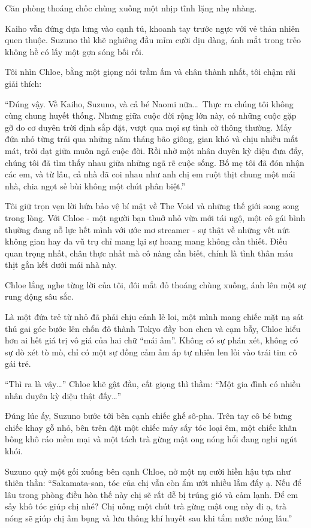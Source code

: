 \documentclass[../main.tex]{subfiles}
\begin{document}
Căn phòng thoáng chốc chùng xuống một nhịp tĩnh lặng nhẹ nhàng.

Kaiho vẫn đứng dựa lưng vào cạnh tủ, khoanh tay trước ngực với vẻ thản nhiên quen thuộc. Suzuno thì khẽ nghiêng đầu mỉm cười dịu dàng, ánh mắt trong trẻo không hề có lấy một gợn sóng bối rối.

Tôi nhìn Chloe, bằng một giọng nói trầm ấm và chân thành nhất, tôi chậm rãi giải thích:

``Đúng vậy. Về Kaiho, Suzuno, và cả bé Naomi nữa\dots\ Thực ra chúng tôi không cùng chung huyết thống. Nhưng giữa cuộc đời rộng lớn này, có những cuộc gặp gỡ do cơ duyên trời định sắp đặt, vượt qua mọi sự tình cờ thông thường. Mấy đứa nhỏ từng trải qua những năm tháng bão giông, gian khó và chịu nhiều mất mát, trôi dạt giữa muôn ngả cuộc đời. Rồi nhờ một nhân duyên kỳ diệu đưa đẩy, chúng tôi đã tìm thấy nhau giữa những ngã rẽ cuộc sống. Bố mẹ tôi đã đón nhận các em, và từ lâu, cả nhà đã coi nhau như anh chị em ruột thịt chung một mái nhà, chia ngọt sẻ bùi không một chút phân biệt.''

Tôi giữ trọn vẹn lời hứa bảo vệ bí mật về The Void và những thế giới song song trong lòng. Với Chloe - một người bạn thuở nhỏ vừa mới tái ngộ, một cô gái bình thường đang nỗ lực hết mình với ước mơ streamer - sự thật về những vết nứt không gian hay đa vũ trụ chỉ mang lại sự hoang mang không cần thiết. Điều quan trọng nhất, chân thực nhất mà cô nàng cần biết, chính là tình thân máu thịt gắn kết dưới mái nhà này.

Chloe lắng nghe từng lời của tôi, đôi mắt đỏ thoáng chùng xuống, ánh lên một sự rung động sâu sắc.

Là một đứa trẻ từ nhỏ đã phải chịu cảnh lẻ loi, một mình mang chiếc mặt nạ sát thủ gai góc bước lên chốn đô thành Tokyo đầy bon chen và cạm bẫy, Chloe hiểu hơn ai hết giá trị vô giá của hai chữ ``mái ấm''. Không có sự phán xét, không có sự dò xét tò mò, chỉ có một sự đồng cảm ấm áp tự nhiên len lỏi vào trái tim cô gái trẻ.

``Thì ra là vậy\dots'' Chloe khẽ gật đầu, cất giọng thì thầm: ``Một gia đình có nhiều nhân duyên kỳ diệu thật đấy\dots''

Đúng lúc ấy, Suzuno bước tới bên cạnh chiếc ghế sô-pha. Trên tay cô bé bưng chiếc khay gỗ nhỏ, bên trên đặt một chiếc máy sấy tóc loại êm, một chiếc khăn bông khô ráo mềm mại và một tách trà gừng mật ong nóng hổi đang nghi ngút khói.

Suzuno quỳ một gối xuống bên cạnh Chloe, nở một nụ cười hiền hậu tựa như thiên thần: ``Sakamata-san, tóc của chị vẫn còn ẩm ướt nhiều lắm đấy ạ. Nếu để lâu trong phòng điều hòa thế này chị sẽ rất dễ bị trúng gió và cảm lạnh. Để em sấy khô tóc giúp chị nhé? Chị uống một chút trà gừng mật ong này đi ạ, trà nóng sẽ giúp chị ấm bụng và lưu thông khí huyết sau khi tắm nước nóng lâu.''
\end{document}
